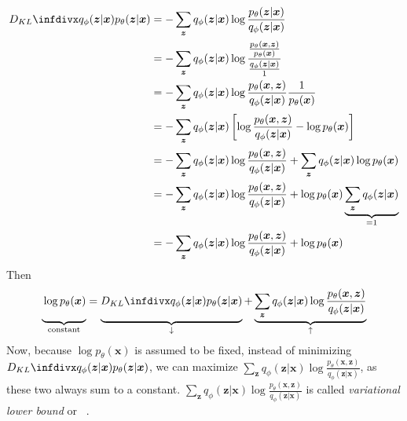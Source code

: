 \begin{align}
    \kldiv{q_\phi(\bm{z}|\bm{x})}{p_\theta(\bm{z}|\bm{x})} &= -\sum_{\bm{z}} q_\phi(\bm{z}|\bm{x}) \log \frac{p_\theta(\bm{z}|\bm{x})}{q_\phi(\bm{z}|\bm{x})} \\
    &= -\sum_{\bm{z}} q_\phi(\bm{z}|\bm{x}) \log \frac{\frac{p_\theta(\bm{x},\bm{z})}{p_\theta(\bm{x})}}{\frac{q_\phi(\bm{z}|\bm{x})}{1}}\\
    &= -\sum_{\bm{z}} q_\phi(\bm{z}|\bm{x}) \log \frac{p_\theta(\bm{x},\bm{z})}{q_\phi(\bm{z}|\bm{x})}\frac{1}{p_\theta(\bm{x})}\\
    &= -\sum_{\bm{z}} q_\phi(\bm{z}|\bm{x}) \left[ \log \frac{p_\theta(\bm{x},\bm{z})}{q_\phi(\bm{z}|\bm{x})} - \log p_\theta(\bm{x}) \right]\\
    &= -\sum_{\bm{z}} q_\phi(\bm{z}|\bm{x}) \log \frac{p_\theta(\bm{x},\bm{z})}{q_\phi(\bm{z}|\bm{x})} + \sum_{\bm{z}} q_\phi(\bm{z}|\bm{x}) \log p_\theta(\bm{x}) \\
    &= -\sum_{\bm{z}} q_\phi(\bm{z}|\bm{x}) \log \frac{p_\theta(\bm{x},\bm{z})}{q_\phi(\bm{z}|\bm{x})} + \log p_\theta(\bm{x}) \underbrace{\sum_{\bm{z}} q_\phi(\bm{z}|\bm{x})}_{=1} \\
    &= -\sum_{\bm{z}} q_\phi(\bm{z}|\bm{x}) \log \frac{p_\theta(\bm{x},\bm{z})}{q_\phi(\bm{z}|\bm{x})} + \log p_\theta(\bm{x})
\end{align}
Then
\begin{align}
    \underbrace{\vphantom{\sum_{\bm{z}} x}\log p_\theta(\bm{x})}_{\text{constant}} =  \underbrace{\vphantom{\sum_{\bm{z}} x}\kldiv{q_\phi(\bm{z}|\bm{x})}{p_\theta(\bm{z}|\bm{x})}}_{\downarrow}  + \underbrace{\sum_{\bm{z}} q_\phi(\bm{z}|\bm{x}) \log \frac{p_\theta(\bm{x},\bm{z})}{q_\phi(\bm{z}|\bm{x})}}_{\uparrow}
\end{align}
Now, because $\log p_\theta(\bm{x})$ is assumed to be fixed, instead of minimizing $\kldiv{q_\phi(\bm{z}|\bm{x})}{p_\theta(\bm{z}|\bm{x})}$, we can maximize $\sum_{\bm{z}} q_\phi(\bm{z}|\bm{x}) \log \frac{p_\theta(\bm{x},\bm{z})}{q_\phi(\bm{z}|\bm{x})}$, as these two always sum to a constant.
$\sum_{\bm{z}} q_\phi(\bm{z}|\bm{x}) \log \frac{p_\theta(\bm{x},\bm{z})}{q_\phi(\bm{z}|\bm{x})}$ is called \textit{variational lower bound} or ~\citep[p. 18]{kingma2019introduction}.

